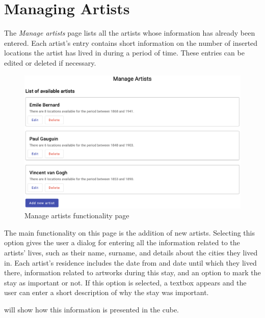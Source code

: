 \section{Managing Artists}\label{sec:managing-artists}
The \emph{Manage artists} page lists all the artists whose information has already been entered. Each artist's entry contains short information on
the number of inserted locations the artist has lived in during a period of time. These entries can be edited or deleted if necessary.

\begin{figure}[hbt!]
    \begin{center}
        \includegraphics[width=\textwidth]{graphics/3-implementation/3}
    \end{center}
    \caption{Manage artists functionality page}
    \label{fig:figure3.3}
\end{figure}

The main functionality on this page is the addition of new artists. Selecting this option gives the user a dialog for entering all the information
related to the artists' lives, such as their name, surname, and details about the cities they lived in. Each artist’s residence includes the date
from and date until which they lived there, information related to artworks during this stay, and an option to mark the stay as important or not.
If this option is selected, a textbox appears and the user can enter a short description of why the stay was important.

 will show how this information is presented in the cube.

